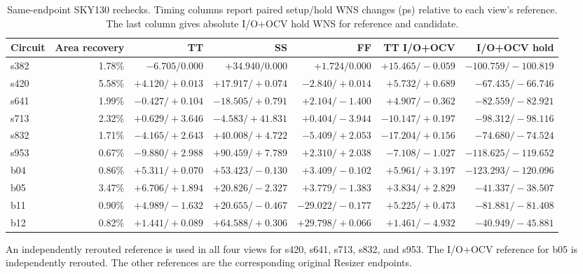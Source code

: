 \documentclass[journal]{IEEEtran}
\begin{document}
\begin{table}[t]
\centering
\caption{Same-endpoint SKY130 rechecks. Timing columns report paired setup/hold WNS changes (ps) relative to each view's reference. The last column gives absolute I/O+OCV hold WNS for reference and candidate.}
\label{tab:aligned}
\footnotesize
\begin{tabular}{lrrrrrr}
\toprule
Circuit & Area recovery & TT & SS & FF & TT I/O+OCV & I/O+OCV hold\\
\midrule
s382 & 1.78\% & \(-6.705/0.000\) & \(+34.940/0.000\) & \(+1.724/0.000\) & \(+15.465/-0.059\) & \(-100.759/-100.819\)\\
s420 & 5.58\% & \(+4.120/+0.013\) & \(+17.917/+0.074\) & \(-2.840/+0.014\) & \(+5.732/+0.689\) & \(-67.435/-66.746\)\\
s641 & 1.99\% & \(-0.427/+0.104\) & \(-18.505/+0.791\) & \(+2.104/-1.400\) & \(+4.907/-0.362\) & \(-82.559/-82.921\)\\
s713 & 2.32\% & \(+0.629/+3.646\) & \(-4.583/+41.831\) & \(+0.404/-3.944\) & \(-10.147/+0.197\) & \(-98.312/-98.116\)\\
s832 & 1.71\% & \(-4.165/+2.643\) & \(+40.008/+4.722\) & \(-5.409/+2.053\) & \(-17.204/+0.156\) & \(-74.680/-74.524\)\\
s953 & 0.67\% & \(-9.880/+2.988\) & \(+90.459/+7.789\) & \(+2.310/+2.038\) & \(-7.108/-1.027\) & \(-118.625/-119.652\)\\
b04 & 0.86\% & \(+5.311/+0.070\) & \(+53.423/-0.130\) & \(+3.409/-0.102\) & \(+5.961/+3.197\) & \(-123.293/-120.096\)\\
b05 & 3.47\% & \(+6.706/+1.894\) & \(+20.826/-2.327\) & \(+3.779/-1.383\) & \(+3.834/+2.829\) & \(-41.337/-38.507\)\\
b11 & 0.90\% & \(+4.989/-1.632\) & \(+20.655/-0.467\) & \(-29.022/-0.177\) & \(+5.225/+0.473\) & \(-81.881/-81.408\)\\
b12 & 0.82\% & \(+1.441/+0.089\) & \(+64.588/+0.306\) & \(+29.798/+0.066\) & \(+1.461/-4.932\) & \(-40.949/-45.881\)\\
\bottomrule
\end{tabular}

\smallskip
\parbox{0.95\textwidth}{\footnotesize An independently rerouted reference is used in all four views for s420, s641, s713, s832, and s953. The I/O+OCV reference for b05 is independently rerouted. The other references are the corresponding original Resizer endpoints.}
\end{table}
\end{document}
